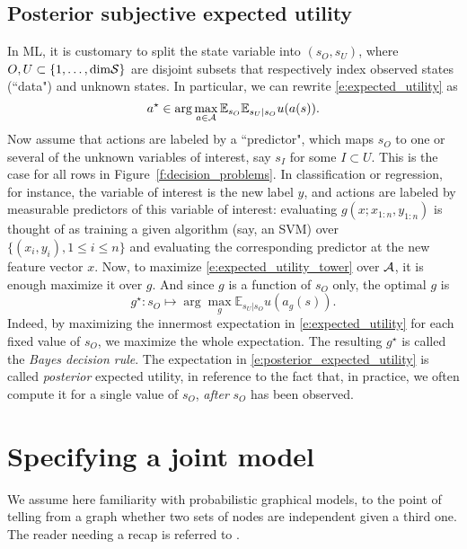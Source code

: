 \subsection{Posterior subjective expected utility}
In ML, it is customary to split the state variable into $(s_O,s_U)$, where $O, U\subset \{1,\dots,\text{dim} \mathcal{S}\}$ are disjoint subsets that respectively index observed states (``data") and unknown states. 
In particular, we can rewrite \eqref{e:expected_utility} as
\begin{equation}
    a^\star \in \arg\max_{a\in\mathcal{A}} \mathbb{E}_{s_O} \mathbb{E}_{s_U\vert s_O} u(a(s)).
    \label{e:expected_utility_tower}
\end{equation}
Now assume that actions are labeled by a ``predictor", which maps $s_O$ to one or several of the unknown variables of interest, say $s_I$ for some $I\subset U$. 
This is the case for all rows in Figure~\ref{f:decision_problems}. 
In classification or regression, for instance, the variable of interest is the new label $y$, and actions are labeled by measurable predictors of this variable of interest: evaluating $g(x; x_{1:n}, y_{1:n})$ is thought of as training a given algorithm (say, an SVM) over $\{(x_i,y_i), 1\leq i\leq n\}$ and evaluating the corresponding predictor at the new feature vector $x$.
Now, to maximize \eqref{e:expected_utility_tower} over $\mathcal{A}$, it is enough maximize it over $g$. 
And since $g$ is a function of $s_O$ only, the optimal $g$ is 
\begin{equation}
    \label{e:posterior_expected_utility}
    g^\star: s_O \mapsto \arg\max_{g} \mathbb{E}_{s_U\vert s_O} u(a_g(s)).
\end{equation}
Indeed, by maximizing the innermost expectation in \eqref{e:expected_utility} for each fixed value of $s_O$, we maximize the whole expectation. 
The resulting $g^\star$ is called the \emph{Bayes decision rule}. 
The expectation in \eqref{e:posterior_expected_utility} is called \emph{posterior} expected utility, in reference to the fact that, in practice, we often compute it for a single value of $s_O$, \emph{after} $s_O$ has been observed. 

\section{Specifying a joint model}
We assume here familiarity with probabilistic graphical models, to the point of telling from a graph whether two sets of nodes are independent given a third one. 
The reader needing a recap is referred to \citep[Sections 10.1 to 10.5]{Mur12}.

